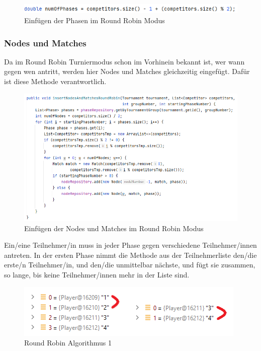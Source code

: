 \begin{figure}[H]
    \includegraphics[scale=1]{pics/backend/roundrobin/roundrobin_insertPhases.png}
    \caption{Einfügen der Phasen im Round Robin Modus}
\end{figure}

\subsubsection{Nodes und Matches}

Da im Round Robin Turniermodus schon im Vorhinein bekannt ist, wer wann gegen wen antritt, werden hier Nodes und Matches gleichzeitig eingefügt. Dafür ist diese Methode verantwortlich.

\begin{figure}[H]
    \includegraphics[scale=0.6]{pics/backend/roundrobin/roundrobin_insertNodesAndMatches.png}
    \caption{Einfügen der Nodes und Matches im Round Robin Modus}
\end{figure}

Ein/eine Teilnehmer/in muss in jeder Phase gegen verschiedene Teilnehmer/innen antreten. In der ersten Phase nimmt die Methode aus der Teilnehmerliste den/die erste/n Teilnehmer/in, und den/die unmittelbar nächste, und fügt sie zusammen, 
so lange, bis keine Teilnehmer/innen mehr in der Liste sind. 

\begin{figure}[H]
    \includegraphics[scale=0.8]{pics/backend/roundrobin/matching_up_1.png}
    \caption{Round Robin Algorithmus 1}
\end{figure}

